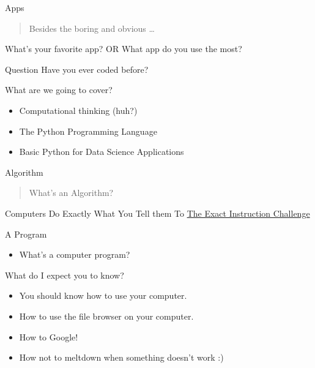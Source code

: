 \begin{frame}{Apps}
\protect\hypertarget{apps}{}
\begin{quote}
Besides the boring and obvious \ldots{}
\end{quote}

What's your favorite app? OR What app do you use the most?
\end{frame}

\begin{frame}{Question}
\protect\hypertarget{question}{}
Have you ever coded before?

\end{frame}

\begin{frame}{What are we going to cover?}
\protect\hypertarget{what-are-we-going-to-cover}{}
\begin{itemize}
\tightlist
\item
  Computational thinking (huh?)
\item
  The Python Programming Language
\item
  Basic Python for Data Science Applications
\end{itemize}
\end{frame}

\begin{frame}{Algorithm}
\protect\hypertarget{algorithm}{}
\begin{quote}
What's an Algorithm?
\end{quote}
\end{frame}

\begin{frame}{Computers Do Exactly What You Tell them To}
\protect\hypertarget{computers-do-exactly-what-you-tell-them-to}{}
\href{https://www.youtube.com/watch?v=Ct-lOOUqmyY}{The Exact Instruction
Challenge}
\end{frame}

\begin{frame}{A Program}
\protect\hypertarget{a-program}{}
\begin{itemize}
\tightlist
\item
  What's a computer program?
\end{itemize}
\end{frame}

\begin{frame}{What do I expect you to know?}
\protect\hypertarget{what-do-i-expect-you-to-know}{}
\begin{itemize}
\tightlist
\item
  You should know how to use your computer.
\item
  How to use the file browser on your computer.
\item
  How to Google!
\item
  How not to meltdown when something doesn't work :)
\end{itemize}
\end{frame}

